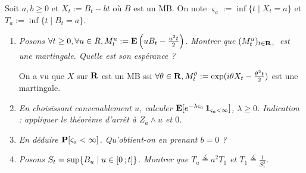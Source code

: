 \begin{ex}
	Soit $a, b \geq 0$ et $X_t := B_t - bt$ où $B$ est un MB.
	On note $\varsigma_a := \inf \{ t \mid X_t = a \}$ et $T_a := \inf \{ t \mid B_t = a \}$.
	\begin{enumerate}[1)]
		\item \textit{Posons $\forall t \geq 0, \forall u \in R, M_t^u := \mathbf{E} \left( u B_t - \frac{u^2 t}{2} \right)$.
			Montrer que $(M_t^u)_{t \in \mathbf{R}_+}$ est une martingale.
			Quelle est son espérance ?}
			
			On a vu que $X$ sur $\mathbf{R}$ est un MB ssi $\forall \theta \in \mathbf{R}, M_t^\theta := \exp (i \theta X_t - \frac{\theta^2 t}{2})$ est une martingale.
		\item \textit{En choisissant convenablement $u$, calculer $\mathbf{E}[e^{-\lambda \varsigma_a} \operatorname{\mathbf{1}}_{\varsigma_a < \infty}]$, $\lambda \geq 0$.
			Indication : appliquer le théorème d'arrêt à $Z_a \wedge u$ et $0$.}
			
		\item \textit{En déduire $\mathbf{P}[\varsigma_a < \infty]$.
			Qu'obtient-on en prenant $b = 0$ ?}
			
		\item \textit{Posons $S_t = \sup \{ B_u \mid u \in \mathopen{}\mathclose{\left[0\mathclose{}\mathpunct{};t\right]} \}$.
			Montrer que $T_a \overset{\mathcal{L}}{=} a^2 T_1$ et $T_1 \overset{\mathcal{L}}{=} \frac{1}{S_1^2}$.}
	\end{enumerate}
\end{ex}